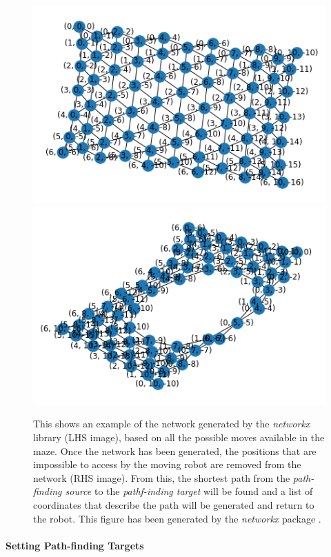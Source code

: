 \begin{figure}[h]
    \centering
    \includegraphics[scale = 0.3]{images/output.png}
    \includegraphics[scale = 0.3]{images/output2.png}
    \caption{This shows an example of the network generated by the \textit{networkx} library (LHS image), based on all the possible moves available in the maze. Once the network has been generated, the positions that are impossible to access by the moving robot are removed from the network (RHS image). From this, the shortest path from the \textit{path-finding source} to the \textit{pathf-inding target} will be found and a list of coordinates that describe the path will be generated and return to the robot. This figure has been generated by the \textit{networkx} package \cite{networkx}.}
    \label{fig:networkx_diagrams}
\end{figure}


\paragraph{Setting Path-finding Targets}
\label{section:pathfinding_targets}

